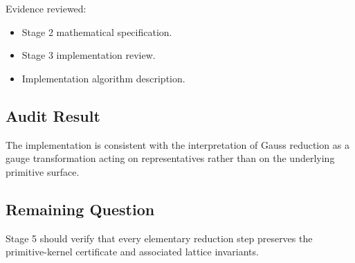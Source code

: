 Evidence reviewed:

\begin{itemize}
\item Stage 2 mathematical specification.
\item Stage 3 implementation review.
\item Implementation algorithm description.
\end{itemize}

\subsection{Audit Result}

The implementation is consistent with the interpretation of Gauss
reduction as a gauge transformation acting on representatives rather
than on the underlying primitive surface.

\subsection{Remaining Question}

Stage 5 should verify that every elementary reduction step preserves the
primitive-kernel certificate and associated lattice invariants.
